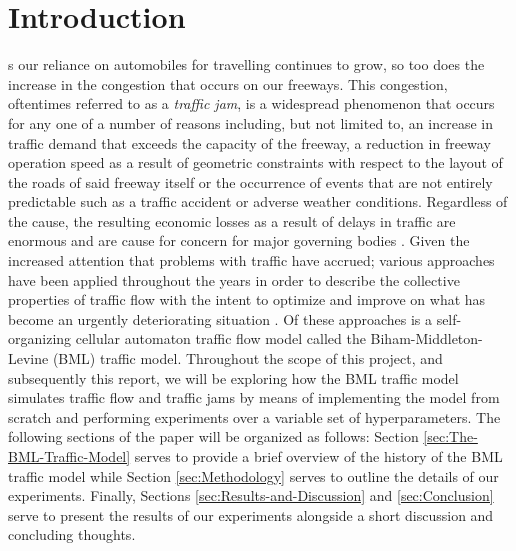 \IEEEraisesectionheading
{
\section{Introduction}
\label{sec:Introduction}
}
s our reliance on automobiles for travelling continues to grow, so too does the increase in the congestion that occurs on our freeways. This congestion, oftentimes referred to as a \textit{traffic jam}, is a widespread phenomenon that occurs for any one of a number of reasons including, but not limited to, an increase in traffic demand that exceeds the capacity of the freeway, a reduction in freeway operation speed as a result of geometric constraints with respect to the layout of the roads of said freeway itself or the occurrence of events that are not entirely predictable such as a traffic accident or adverse weather conditions. Regardless of the cause, the resulting economic losses as a result of delays in traffic are enormous and are cause for concern for major governing bodies \cite{DYin}. Given the increased attention that problems with traffic have accrued; various approaches have been applied throughout the years in order to describe the collective properties of traffic flow \cite{Nagatani} with the intent to optimize and improve on what has become an urgently deteriorating situation \cite{Helbing}. Of these approaches is a self-organizing cellular automaton traffic flow model called the Biham-Middleton-Levine (BML) traffic model. Throughout the scope of this project, and subsequently this report, we will be exploring how the BML traffic model simulates traffic flow and traffic jams by means of implementing the model from scratch and performing experiments over a variable set of hyperparameters. The following sections of the paper will be organized as follows: Section \ref{sec:The-BML-Traffic-Model} serves to provide a brief overview of the history of the BML traffic model while Section \ref{sec:Methodology} serves to outline the details of our experiments. Finally, Sections \ref{sec:Results-and-Discussion} and \ref{sec:Conclusion} serve to present the results of our experiments alongside a short discussion and concluding thoughts.